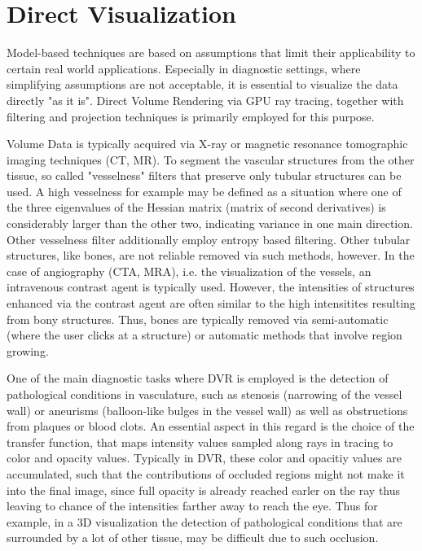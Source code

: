 \section{Direct Visualization}

Model-based techniques are based on assumptions that limit their applicability to certain real world applications. Especially in diagnostic settings, where simplifying assumptions are not acceptable, it is essential to visualize the data directly "as it is". Direct Volume Rendering via GPU ray tracing, together with filtering and projection techniques is primarily employed for this purpose.

Volume Data is typically acquired via X-ray or magnetic resonance tomographic imaging techniques (CT, MR). To segment the vascular structures from the other tissue, so called "vesselness" filters that preserve only tubular structures can be used. A high vesselness for example may be defined as a situation where one of the three eigenvalues of the Hessian matrix (matrix of second derivatives) is considerably larger than the other two, indicating variance in one main direction. Other vesselness filter additionally employ entropy based filtering. Other tubular structures, like bones, are not reliable removed via such methods, however. In the case of angiography (CTA, MRA), i.e. the visualization of the vessels, an intravenous contrast agent is typically used. However, the intensities of structures enhanced via the contrast agent are often similar to the high intensitites resulting from bony structures. Thus, bones are typically removed via semi-automatic (where the user clicks at a structure) or automatic methods that involve region growing.

One of the main diagnostic tasks where DVR is employed is the detection of pathological conditions in vasculature, such as stenosis (narrowing of the vessel wall) or aneurisms (balloon-like bulges in the vessel wall) as well as obstructions from plaques or blood clots. An essential aspect in this regard is the choice of the transfer function, that maps intensity values sampled along rays in tracing to color and opacity values. Typically in DVR, these color and opacitiy values are accumulated, such that the contributions of occluded regions might not make it into the final image, since full opacity is already reached earler on the ray thus leaving to chance of the intensities farther away to reach the eye. Thus for example, in a 3D visualization the detection of pathological conditions that are surrounded by a lot of other tissue, may be difficult due to such occlusion.

